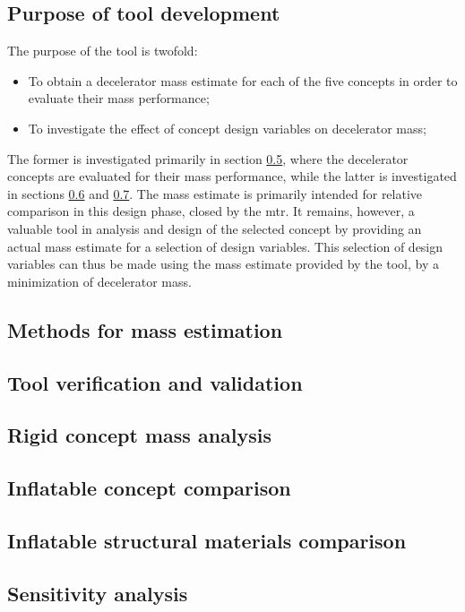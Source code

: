 \subsection{Purpose of tool development}\label{sec:strucpurp}
The purpose of the tool is twofold:
\begin{itemize}
\item To obtain a decelerator mass estimate for each of the five concepts in order to evaluate their mass performance;
\item To investigate the effect of concept design variables on decelerator mass;
\end{itemize}
The former is investigated primarily in section \ref{sec:struccc}, where the decelerator concepts are evaluated for their mass performance, while the latter is investigated in sections \ref{sec:strucmat} and \ref{sec:strucsens}. The mass estimate is primarily intended for relative comparison in this design phase, closed by the \acrfull{mtr}. It remains, however, a valuable tool in analysis and design of the selected concept by providing an actual mass estimate for a selection of design variables. This selection of design variables can thus be made using the mass estimate provided by the tool, by a minimization of decelerator mass.

\subsection{Methods for mass estimation}\label{sec:strucmeth}

\subsection{Tool verification and validation}\label{sec:strucvv}

\subsection{Rigid concept mass analysis}\label{sec:rigid}   %

\subsection{Inflatable concept comparison}\label{sec:struccc}

\subsection{Inflatable structural materials comparison}\label{sec:strucmat}

\subsection{Sensitivity analysis}\label{sec:strucsens}


